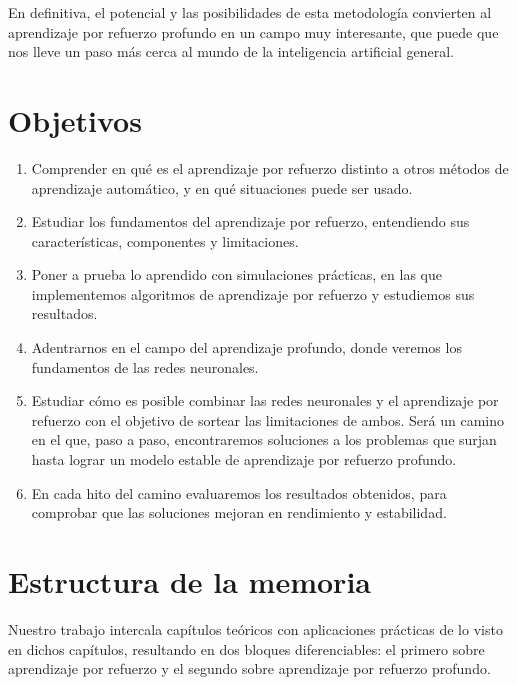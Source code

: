 En definitiva, el potencial y las posibilidades de esta metodología convierten al aprendizaje por refuerzo profundo en un campo muy interesante, que puede que nos lleve un paso más cerca al mundo de la inteligencia artificial general.


\section{Objetivos}

\begin{enumerate}
    \item Comprender en qué es el aprendizaje por refuerzo distinto a otros métodos de aprendizaje automático, y en qué situaciones puede ser usado.
    \item Estudiar los fundamentos del aprendizaje por refuerzo, entendiendo sus características, componentes y limitaciones.
    \item Poner a prueba lo aprendido con simulaciones prácticas, en las que implementemos algoritmos de aprendizaje por refuerzo y estudiemos sus resultados.
    \item Adentrarnos en el campo del aprendizaje profundo, donde veremos los fundamentos de las redes neuronales.
    \item Estudiar cómo es posible combinar las redes neuronales y el aprendizaje por refuerzo con el objetivo de sortear las limitaciones de ambos. Será un camino en el que, paso a paso, encontraremos soluciones a los problemas que surjan hasta lograr un modelo estable de aprendizaje por refuerzo profundo.
    \item En cada hito del camino evaluaremos los resultados obtenidos, para comprobar que las soluciones mejoran en rendimiento y estabilidad.
\end{enumerate}


\section{Estructura de la memoria}

Nuestro trabajo intercala capítulos teóricos con aplicaciones prácticas de lo visto en dichos capítulos, resultando en dos bloques diferenciables: el primero sobre aprendizaje por refuerzo y el segundo sobre aprendizaje por refuerzo profundo.

